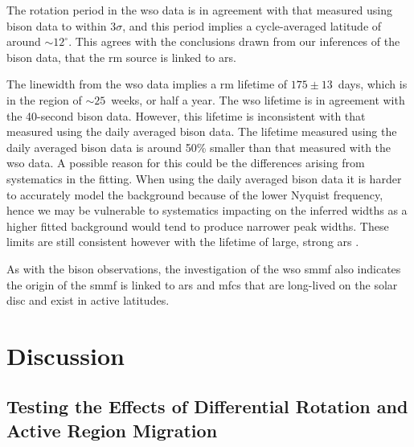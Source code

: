 The rotation period in the \gls{wso} data is in agreement with that measured using \gls{bison} data to within 3$\sigma$, and this period implies a cycle-averaged latitude of around $\sim12^{\circ}$. This agrees with the conclusions drawn from our inferences of the \gls{bison} data, that the \gls{rm} source is linked to \glspl{ar}.


The linewidth from the \gls{wso} data implies a \gls{rm} lifetime of $175 \pm 13$~days, which is in the region of $\sim 25$~weeks, or half a year. The \gls{wso} lifetime is in agreement with the 40-second \gls{bison} data. However, this lifetime is inconsistent with that measured using the daily averaged \gls{bison} data. The lifetime measured using the daily averaged \gls{bison} data is around 50\% smaller than that measured with the \gls{wso} data. A possible reason for this could be the differences arising from systematics in the fitting. When using the daily averaged \gls{bison} data it is harder to accurately model the background because of the lower Nyquist frequency, hence we may be vulnerable to systematics impacting on the inferred widths as a higher fitted background would tend to produce narrower peak widths. %
These limits are still consistent however with the lifetime of large, strong \glspl{ar} \citep{schrijver_photospheric_1994, van_driel-gesztelyi_evolution_2015}. 

As with the \gls{bison} observations, the investigation of the \gls{wso} \gls{smmf} also indicates the origin of the \gls{smmf} is linked to \glspl{ar} and \glspl{mfc} that are long-lived on the solar disc and exist in active latitudes.



\section{Discussion}\label{sec:SMMF_artificial}



\subsection{Testing the Effects of Differential Rotation and Active Region Migration}
\label{sec:smearing}


